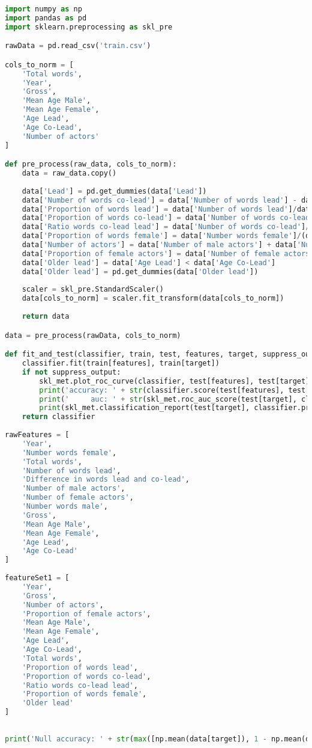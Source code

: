 \documentclass[../../project.tex]{subfiles}
\begin{document}
	\begin{lstlisting}[language=Python]
import numpy as np
import pandas as pd
import sklearn.preprocessing as skl_pre

rawData = pd.read_csv('train.csv')

cols_to_norm = [
	'Total words',
	'Year',
	'Gross',
	'Mean Age Male',
	'Mean Age Female',
	'Age Lead',
	'Age Co-Lead',
	'Number of actors'
]

def pre_process(raw_data, cols_to_norm):
	data = raw_data.copy()
	
	data['Lead'] = pd.get_dummies(data['Lead'])
	data['Number of words co-lead'] = data['Number of words lead'] - data['Difference in words lead and co-lead']
	data['Proportion of words lead'] = data['Number of words lead']/data['Total words']
	data['Proportion of words co-lead'] = data['Number of words co-lead']/data['Total words']
	data['Ratio words co-lead lead'] = data['Number of words co-lead']/data['Number of words lead']
	data['Proportion of words female'] = data['Number words female']/(data['Total words'] - data['Number of words lead'])
	data['Number of actors'] = data['Number of male actors'] + data['Number of female actors']
	data['Proportion of female actors'] = data['Number of female actors']/data['Number of actors']
	data['Older lead'] = data['Age Lead'] < data['Age Co-Lead']
	data['Older lead'] = pd.get_dummies(data['Older lead'])
	
	scaler = skl_pre.StandardScaler()
	data[cols_to_norm] = scaler.fit_transform(data[cols_to_norm])
	
	return data

data = pre_process(rawData, cols_to_norm)

def fit_and_test(classifier, train, test, features, target, suppress_output = False):
	classifier.fit(train[features], train[target])
	if not suppress_output:
		skl_met.plot_roc_curve(classifier, test[features], test[target])
		print('accuracy: ' + str(classifier.score(test[features], test[target])))
		print('     auc: ' + str(skl_met.roc_auc_score(test[target], classifier.predict_proba(test[features])[:,1])) + '\n')
		print(skl_met.classification_report(test[target], classifier.predict(test[features])))
	return classifier
	
rawFeatures = [
    'Year',
    'Number words female',
    'Total words',
    'Number of words lead',
    'Difference in words lead and co-lead',
    'Number of male actors',
    'Number of female actors',
    'Number words male',
    'Gross',
    'Mean Age Male',
    'Mean Age Female',
    'Age Lead',
    'Age Co-Lead'
]
	
featureSet1 = [
	'Year',
	'Gross',
	'Number of actors',
	'Proportion of female actors',
	'Mean Age Male',
	'Mean Age Female',
	'Age Lead',
	'Age Co-Lead',
	'Total words',
	'Proportion of words lead',
	'Proportion of words co-lead',
	'Ratio words co-lead lead',
	'Proportion of words female',
	'Older lead'
]	
	
	
print('Null accuracy: ' + str(max([np.mean(data[target]), 1 - np.mean(data[target])])))
	\end{lstlisting}
\end{document}
